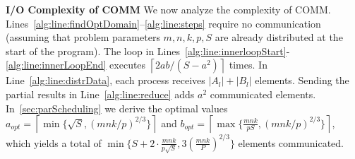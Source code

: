 \documentclass[sigplan,review,anonymous,10pt]{acmart}\settopmatter{printfolios=true,printccs=false,printacmref=false}
\newcommand{\macb}[1]{\textbf{\textsf{#1}}}
\begin{document}
\macb{I/O Complexity of COMM}
We now analyze the complexity of COMM. 
Lines~\ref{alg:line:findOptDomain}--\ref{alg:line:steps} require no 
communication 
(assuming that problem 
parameters $m, n, k, p, S$ are already distributed at the start of the program).
The loop in Lines~\ref{alg:line:innerloopStart}-\ref{alg:line:innerLoopEnd} 
executes $\left\lceil{2ab/(S-a^2)}\right \rceil$ times. In 
Line~\ref{alg:line:distrData}, each process receives $|A_l| + |B_l|$ elements.
Sending the partial results in 
Line~\ref{alg:line:reduce} adds $a^2$ communicated elements. 
In~\cref{sec:parScheduling} we derive the optimal values $a_{opt} = 
\left\lceil{\min\{\sqrt{S}, 
(mnk/p)^{2/3}\}}\right\rceil$ and  $b_{opt} = 
\left\lceil{\max\{\frac{mnk}{pS}, 
(mnk/p)^{2/3}\}}\right\rceil$, which yields a total of 
$\min \Big\{S + 2 \cdot \frac{mnk}{p\sqrt{S}}, 3 
\left(\frac{mnk}{P}\right)^{2/3} \Big\}$ elements communicated.
%
%
%
%
%
\end{document}
